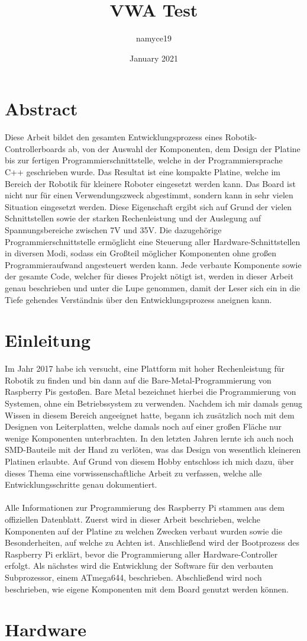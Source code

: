\documentclass[12pt]{article}
\title{VWA Test}
\author{namyce19 }
\date{January 2021}
\begin{document}
\fontsize{12pt}{18pt}\selectfont
\tableofcontents

\newpage\section*{Abstract}
Diese Arbeit bildet den gesamten Entwicklungsprozess eines Robotik-Controllerboards ab, von der Auswahl der Komponenten, dem Design der Platine bis zur fertigen Programmierschnittstelle, welche in der Programmiersprache C++ geschrieben wurde. Das Resultat ist eine kompakte Platine, welche im Bereich der Robotik für kleinere Roboter eingesetzt werden kann. Das Board ist nicht nur für einen Verwendungszweck abgestimmt, sondern kann in sehr vielen Situation eingesetzt werden. Diese Eigenschaft ergibt sich auf Grund der vielen Schnittstellen sowie der starken Rechenleistung und der Auslegung auf Spannungsbereiche zwischen 7V und 35V. Die dazugehörige Programmierschnittstelle ermöglicht eine Steuerung aller Hardware-Schnittstellen in diversen Modi, sodass ein Großteil möglicher Komponenten ohne großen Programmieraufwand angesteuert werden kann. Jede verbaute Komponente sowie der gesamte Code, welcher für dieses Projekt nötigt ist, werden in dieser Arbeit genau beschrieben und unter die Lupe genommen, damit der Leser sich ein in die Tiefe gehendes Verständnis über den Entwicklungsprozess aneignen kann.
\newpage\section{Einleitung}
Im Jahr 2017 habe ich versucht, eine Plattform mit hoher Rechenleistung für Robotik zu finden und bin dann auf die Bare-Metal-Programmierung von Raspberry Pis gestoßen. Bare Metal bezeichnet hierbei die Programmierung von Systemen, ohne ein Betriebssystem zu verwenden. Nachdem ich mir damals genug Wissen in diesem Bereich angeeignet hatte, begann ich zusätzlich noch mit dem Designen von Leiterplatten, welche damals noch auf einer großen Fläche nur wenige Komponenten unterbrachten. In den letzten Jahren lernte ich auch noch SMD-Bauteile mit der Hand zu verlöten, was das Design von wesentlich kleineren Platinen erlaubte. Auf Grund von diesem Hobby entschloss ich mich dazu, über dieses Thema eine vorwissenschaftliche Arbeit zu verfassen, welche alle Entwicklungsschritte genau dokumentiert.\\\\
Alle Informationen zur Programmierung des Raspberry Pi stammen aus dem offiziellen Datenblatt. Zuerst wird in dieser Arbeit beschrieben, welche Komponenten auf der Platine zu welchen Zwecken verbaut wurden sowie die Besonderheiten, auf welche zu Achten ist. Anschließend wird der Bootprozess des Raspberry Pi erklärt, bevor die Programmierung aller Hardware-Controller erfolgt. Als nächstes wird die Entwicklung der Software für den verbauten Subprozessor, einem ATmega644, beschrieben. Abschließend wird noch beschrieben, wie eigene Komponenten mit dem Board genutzt werden können.
\newpage\section{Hardware}
\end{document}
